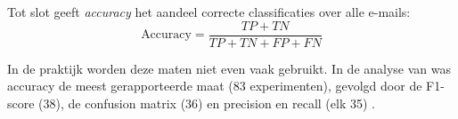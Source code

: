 Tot slot geeft \emph{accuracy} het aandeel correcte classificaties over alle e-mails:
\begin{equation*}
    \text{Accuracy} = \frac{TP + TN}{TP + TN + FP + FN}
\end{equation*}

In de praktijk worden deze maten niet even vaak gebruikt. In de analyse van \textcite{Salloum2022} was accuracy de meest gerapporteerde maat (83 experimenten), gevolgd door de F1-score (38), de confusion matrix (36) en precision en recall (elk 35) \autocite{Salloum2022}.
